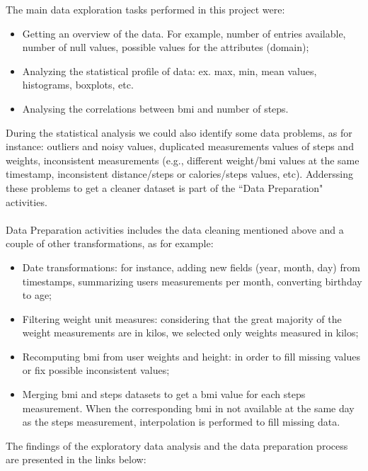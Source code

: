 \documentclass[11pt]{iopart}
\begin{document}
The main data exploration  tasks performed in this project were:
\begin{itemize}
\item Getting an overview of the data. For example, number of entries available, number of null values, possible values for the attributes (domain);
\item Analyzing the statistical profile of data: ex. max, min, mean values, histograms, boxplots, etc.
\item Analysing the correlations between bmi and number of steps.
\end{itemize}
During the  statistical analysis we could also identify some data problems, as for instance:
outliers and noisy values, duplicated measurements values of steps and weights, inconsistent measurements  (e.g., different weight/bmi values at the same timestamp, inconsistent distance/steps or calories/steps values, etc).  Adderssing  these problems to get a cleaner dataset is part of the ``Data Preparation" activities. \\ \\
Data Preparation activities includes the data cleaning mentioned above and a couple of other transformations, as for example: 
\begin{itemize}
\item Date transformations: for instance, adding new fields (year, month, day) from timestamps, summarizing users measurements per month, converting birthday to age;
\item Filtering weight unit measures:  considering that the great majority of the weight measurements  are in kilos, we selected only weights measured in kilos;
\item Recomputing bmi from user weights and height: in order to fill missing values or fix possible inconsistent values;
\item Merging bmi and steps datasets to get a bmi value for each steps measurement. When the corresponding bmi in not available at the same day as the steps measurement, interpolation is performed to fill missing data.
\end{itemize}
The findings of the exploratory data analysis and the data preparation process are presented in the links below:
\end{document}
